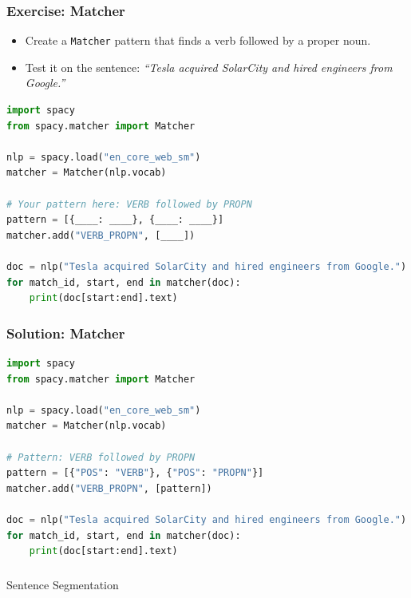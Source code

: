 \begin{frame}[fragile]\frametitle{Exercise: Matcher}
\begin{itemize}
  \item Create a \texttt{Matcher} pattern that finds a verb followed by a proper noun.
  \item Test it on the sentence: \textit{``Tesla acquired SolarCity and hired engineers from Google.''}
\end{itemize}
\begin{lstlisting}[language=Python, basicstyle=\tiny]
import spacy
from spacy.matcher import Matcher

nlp = spacy.load("en_core_web_sm")
matcher = Matcher(nlp.vocab)

# Your pattern here: VERB followed by PROPN
pattern = [{____: ____}, {____: ____}]
matcher.add("VERB_PROPN", [____])

doc = nlp("Tesla acquired SolarCity and hired engineers from Google.")
for match_id, start, end in matcher(doc):
    print(doc[start:end].text)
\end{lstlisting}
\end{frame}

\begin{frame}[fragile]\frametitle{Solution: Matcher}
\begin{lstlisting}[language=Python, basicstyle=\tiny]
import spacy
from spacy.matcher import Matcher

nlp = spacy.load("en_core_web_sm")
matcher = Matcher(nlp.vocab)

# Pattern: VERB followed by PROPN
pattern = [{"POS": "VERB"}, {"POS": "PROPN"}]
matcher.add("VERB_PROPN", [pattern])

doc = nlp("Tesla acquired SolarCity and hired engineers from Google.")
for match_id, start, end in matcher(doc):
    print(doc[start:end].text)
\end{lstlisting}
\end{frame}

\begin{frame}[fragile]\frametitle{}
\begin{center}
{\Large Sentence Segmentation}
\end{center}
\end{frame}

